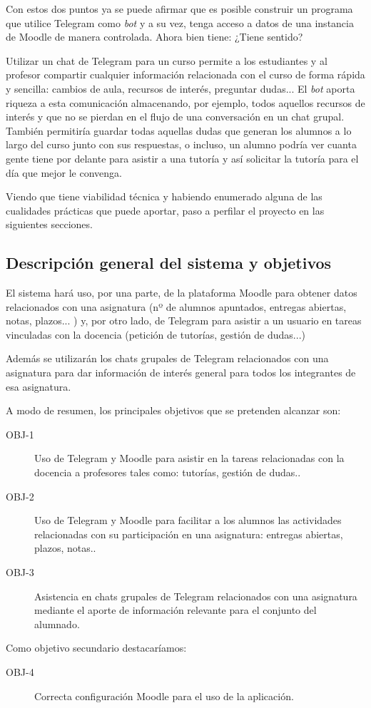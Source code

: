 Con estos dos puntos ya se puede afirmar que es posible construir un programa que utilice Telegram como \textit{bot} y a su vez, tenga acceso a datos de una instancia de Moodle de manera controlada. Ahora bien tiene: ¿Tiene sentido?

Utilizar un chat de Telegram para un curso permite a los estudiantes y al profesor compartir cualquier información relacionada con el curso de forma rápida y sencilla: cambios de aula, recursos de interés, preguntar dudas... El \textit{bot} aporta riqueza a esta comunicación  almacenando, por ejemplo, todos aquellos recursos de interés y que no se pierdan en el flujo de una conversación en un chat grupal. También  permitiría guardar todas aquellas dudas que generan los alumnos a lo largo del curso junto con sus respuestas, o incluso, un alumno podría ver cuanta gente tiene por delante para asistir a una tutoría y así solicitar la tutoría para el día que mejor le convenga.

Viendo que tiene viabilidad técnica y habiendo enumerado alguna de las cualidades prácticas que puede aportar, paso a perfilar el proyecto en las siguientes secciones.


\subsection{Descripción general del sistema y objetivos}

El sistema hará uso, por una parte, de la plataforma  Moodle para obtener datos relacionados con una asignatura (nº de alumnos apuntados, entregas abiertas, notas, plazos... ) y, por otro lado, de Telegram para asistir a un usuario en tareas vinculadas con la docencia (petición de tutorías, gestión de  dudas...) 

Además se utilizarán los chats grupales de Telegram relacionados  con una asignatura para dar información de interés general para todos los integrantes de esa asignatura.

A modo de resumen, los principales objetivos que se pretenden alcanzar son:

\begin{description}
\item[OBJ-1] Uso de Telegram y Moodle para asistir en la tareas relacionadas con la docencia a profesores tales como: tutorías, gestión de dudas.. \newline

\item[OBJ-2] Uso de Telegram y Moodle para facilitar a los alumnos las actividades relacionadas con su participación en una asignatura: entregas abiertas, plazos, notas.. \newline

\item[OBJ-3] Asistencia en chats grupales de Telegram relacionados con una asignatura mediante el aporte de información relevante para el conjunto del alumnado.
\end{description}


Como objetivo secundario destacaríamos:


\begin{description}
\item[OBJ-4] Correcta configuración Moodle para el uso de la aplicación. \newline
\end{description}


